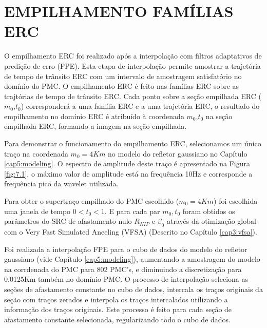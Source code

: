 %
% 
% 
% 
% 
% 
% 

\chapter{EMPILHAMENTO FAMÍLIAS ERC}
\label{cap7:empilhamento}

O empilhamento ERC foi realizado após a interpolação com filtros adaptativos de predição de erro (FPE). Esta etapa de
interpolação permite amostrar a trajetória de tempo de trânsito ERC com um intervalo de amostragem satisfatório no
domínio do PMC. O empilhamento ERC é feito nas famílias ERC sobre as trajtórias de tempo de trânsito ERC. Cada ponto sobre
a seção empilhada ERC ($m_0$,$t_0$) corresponderá a uma família ERC e a uma trajetória ERC, 
o resultado do empilhamento no domínio
ERC é atribuído à coordenada $m_0$,$t_0$ na seção empilhada ERC, formando a imagem na seção empilhada.

Para demonstrar o funcionamento do empilhamento ERC, selecionamos um único traço na coordenada $m_0=4Km$ no modelo do refletor
gaussiano no Capítulo \ref{cap5:modeling}. O espectro de amplitude deste traço é apresentado na Figura \ref{fig:7.1},
o máximo valor de amplitude 
está na frequência 10Hz e corresponde a frequência pico da wavelet utilizada.

Para obter o supertraço empilhado do PMC escolhido ($m_0=4Km$) foi escolhida uma janela de tempo $0<t_0<1$.
E para cada par $m_0, t_0$ foram obtidos os parâmetros do SRC de afastamento nulo $R_{NIP}$ e $\beta_0$ 
através da otimização global com o Very Fast Simulated Aneeling (VFSA) (Descrito no Capítulo \ref{cap3:vfsa}).

Foi realizada a interpolação FPE para o cubo de dados do modelo do refletor gaussiano (vide Capítulo \ref{cap5:modeling}),
aumentando a amostragem
do modelo na corrdenada do PMC para 802 PMC's, e diminuindo a discretização para 0.0125Km também no domínio PMC. O processo 
de interpolação seleciona as seções de afastamento constante no cubo de dados, intercala os traços originais da seção com traços 
zerados e interpola os traços intercalados utilizando a informação dos traços originais. Este processo é feito para cada seção
de afastamento constante selecionada, regularizando todo o cubo de dados.

